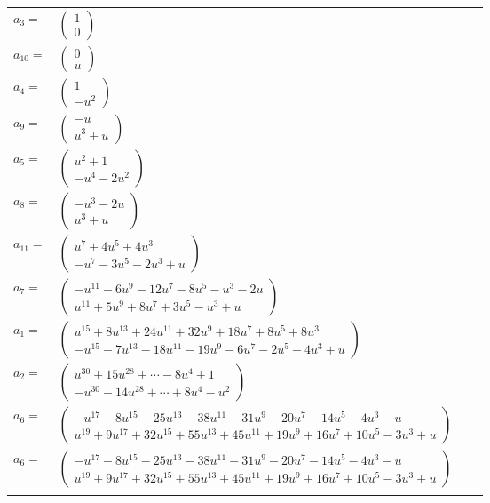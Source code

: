 \documentclass[1p]{elsarticle_modified}
\theoremstyle{definition}
\begin{document}
\begin{tabular}{m{7pt} m{180pt} m{7pt} m{180pt} }
\flushright $a_{3}=$&$\begin{pmatrix}1\\0\end{pmatrix}$ \\
\flushright $a_{10}=$&$\begin{pmatrix}0\\u\end{pmatrix}$ \\
\flushright $a_{4}=$&$\begin{pmatrix}1\\- u^2\end{pmatrix}$ \\
\flushright $a_{9}=$&$\begin{pmatrix}- u\\u^3+u\end{pmatrix}$ \\
\flushright $a_{5}=$&$\begin{pmatrix}u^2+1\\- u^4-2 u^2\end{pmatrix}$ \\
\flushright $a_{8}=$&$\begin{pmatrix}- u^3-2 u\\u^3+u\end{pmatrix}$ \\
\flushright $a_{11}=$&$\begin{pmatrix}u^7+4 u^5+4 u^3\\- u^7-3 u^5-2 u^3+u\end{pmatrix}$ \\
\flushright $a_{7}=$&$\begin{pmatrix}- u^{11}-6 u^9-12 u^7-8 u^5- u^3-2 u\\u^{11}+5 u^9+8 u^7+3 u^5- u^3+u\end{pmatrix}$ \\
\flushright $a_{1}=$&$\begin{pmatrix}u^{15}+8 u^{13}+24 u^{11}+32 u^9+18 u^7+8 u^5+8 u^3\\- u^{15}-7 u^{13}-18 u^{11}-19 u^9-6 u^7-2 u^5-4 u^3+u\end{pmatrix}$ \\
\flushright $a_{2}=$&$\begin{pmatrix}u^{30}+15 u^{28}+\cdots-8 u^4+1\\- u^{30}-14 u^{28}+\cdots+8 u^4- u^2\end{pmatrix}$ \\
\flushright $a_{6}=$&$\begin{pmatrix}- u^{17}-8 u^{15}-25 u^{13}-38 u^{11}-31 u^9-20 u^7-14 u^5-4 u^3- u\\u^{19}+9 u^{17}+32 u^{15}+55 u^{13}+45 u^{11}+19 u^9+16 u^7+10 u^5-3 u^3+u\end{pmatrix}$\\ \flushright $a_{6}=$&$\begin{pmatrix}- u^{17}-8 u^{15}-25 u^{13}-38 u^{11}-31 u^9-20 u^7-14 u^5-4 u^3- u\\u^{19}+9 u^{17}+32 u^{15}+55 u^{13}+45 u^{11}+19 u^9+16 u^7+10 u^5-3 u^3+u\end{pmatrix}$\\&\end{tabular}
\end{document}
